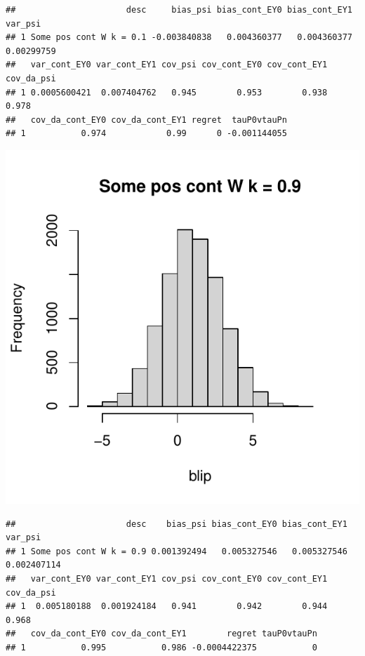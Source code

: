 \documentclass[11pt]{article}\usepackage[]{graphicx}\usepackage[table]{xcolor}
\makeatletter
\def\maxwidth{ %
  \ifdim\Gin@nat@width>\linewidth
    \linewidth
  \else
    \Gin@nat@width
  \fi
}
\newenvironment{kframe}{%
 \def\at@end@of@kframe{}%
 \ifinner\ifhmode%
  \def\at@end@of@kframe{\end{minipage}}%
  \begin{minipage}{\columnwidth}%
 \fi\fi%
 \def\FrameCommand##1{\hskip\@totalleftmargin \hskip-\fboxsep
 \colorbox{shadecolor}{##1}\hskip-\fboxsep
     \hskip-\linewidth \hskip-\@totalleftmargin \hskip\columnwidth}%
 \MakeFramed {\advance\hsize-\width
   \@totalleftmargin\z@ \linewidth\hsize
   \@setminipage}}%
 {\par\unskip\endMakeFramed%
 \at@end@of@kframe}
\newenvironment{knitrout}{}{} %
\makeatother
\begin{document}
\begin{knitrout}
\begin{kframe}\begin{verbatim}
##                      desc     bias_psi bias_cont_EY0 bias_cont_EY1    var_psi
## 1 Some pos cont W k = 0.1 -0.003840838   0.004360377   0.004360377 0.00299759
##   var_cont_EY0 var_cont_EY1 cov_psi cov_cont_EY0 cov_cont_EY1 cov_da_psi
## 1 0.0005600421  0.007404762   0.945        0.953        0.938      0.978
##   cov_da_cont_EY0 cov_da_cont_EY1 regret  tauP0vtauPn
## 1           0.974            0.99      0 -0.001144055
\end{verbatim}
\end{kframe}
\includegraphics[width=\maxwidth]{figure/unnamed-chunk-4-10} 
\begin{kframe}\begin{verbatim}
##                      desc    bias_psi bias_cont_EY0 bias_cont_EY1     var_psi
## 1 Some pos cont W k = 0.9 0.001392494   0.005327546   0.005327546 0.002407114
##   var_cont_EY0 var_cont_EY1 cov_psi cov_cont_EY0 cov_cont_EY1 cov_da_psi
## 1  0.005180188  0.001924184   0.941        0.942        0.944      0.968
##   cov_da_cont_EY0 cov_da_cont_EY1        regret tauP0vtauPn
## 1           0.995           0.986 -0.0004422375           0
\end{verbatim}
\end{kframe}

\end{knitrout}
\end{document}
